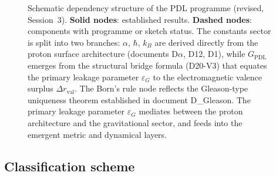 \documentclass[11pt,a4paper]{article}
\begin{document}
\begin{figure}[H]

  \caption{Schematic dependency structure of the PDL programme (revised, Session~3). \textbf{Solid nodes}: established results. \textbf{Dashed nodes}: components with programme or sketch status. The constants sector is split into two branches: $\alpha$, $\hbar$, $k_B$ are derived directly from the proton surface architecture (documents D$\alpha$, D12, D1), while $G_{\mathrm{PDL}}$ emerges from the structural bridge formula (D20-V3) that equates the primary leakage parameter $\varepsilon_G$ to the electromagnetic valence surplus $\Delta r_{\mathrm{val}}$. The Born's rule node reflects the Gleason-type uniqueness theorem established in document D\_Gleason. The primary leakage parameter $\varepsilon_G$ mediates between the proton architecture and the gravitational sector, and feeds into the emergent metric and dynamical layers.}
  \label{fig:pdl_dependency}
\end{figure}

\subsection{Classification scheme}
\label{subsec:classification_scheme}
\end{document}
